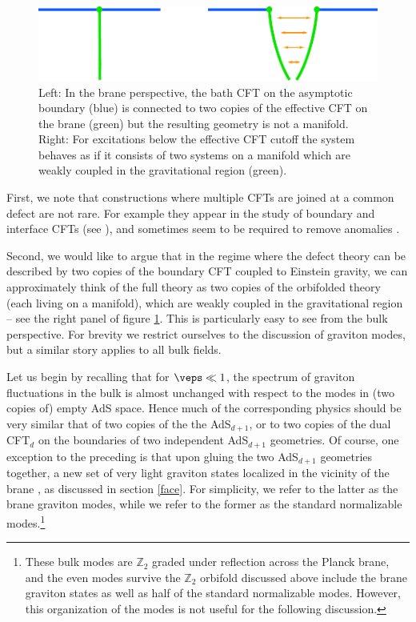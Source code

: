 \begin{figure}[t]
\centering
\includegraphics[scale = 0.7]{no_mfld}
\caption{Left: In the brane perspective, the bath CFT on the asymptotic boundary (blue) is connected to two copies of the effective CFT on the brane (green) but the resulting geometry is not a manifold. Right: For excitations below the effective CFT cutoff the system behaves as if it consists of two systems on a manifold which are weakly coupled in the gravitational region (green).}
\label{fig:no_mfld}
\end{figure}

First, we note that constructions where multiple CFTs are joined at a common defect are not rare. For example they appear in the study of boundary and interface CFTs (\eg see \cite{Chiodaroli:2012vc}), and sometimes seem to be required to remove anomalies \cite{Ooguri:2020sua}.

Second, we would like to argue that in the regime where the defect theory can be described by two copies of the boundary CFT coupled to Einstein gravity, we can approximately think of the full theory as two copies of the orbifolded theory (each living on a manifold), which are weakly coupled in the gravitational region -- see the right panel of figure \ref{fig:no_mfld}. This is particularly easy to see from the bulk perspective. For brevity we restrict ourselves to the discussion of graviton modes, but a similar story applies to all bulk fields. 

Let us begin by recalling that for $\veps \ll 1$, the spectrum of graviton fluctuations in the bulk is almost unchanged with respect to the modes in (two copies of) empty AdS space. Hence much of the corresponding physics should be very similar that of two copies of the the AdS$_{d+1}$, or to two copies of the dual CFT$_d$ on the boundaries of two independent AdS$_{d+1}$ geometries. Of course, one exception to the preceding is that upon gluing the two AdS$_{d+1}$ geometries together, a new set of very light graviton states localized in the vicinity of the brane \cite{Randall:1999vf,Randall:1999ee,Karch:2000ct,Karch:2001jb}, as discussed in section \ref{face}. For simplicity, we refer to the latter as the brane graviton modes, while we refer to the former as the standard normalizable modes.\footnote{These bulk modes are $\mathbb Z_2$ graded under reflection across the Planck brane, and the even modes survive the $\mathbb Z_2$ orbifold discussed above include the brane graviton states as well as half of the standard normalizable modes. However, this organization of the modes is not useful for the following discussion.}

